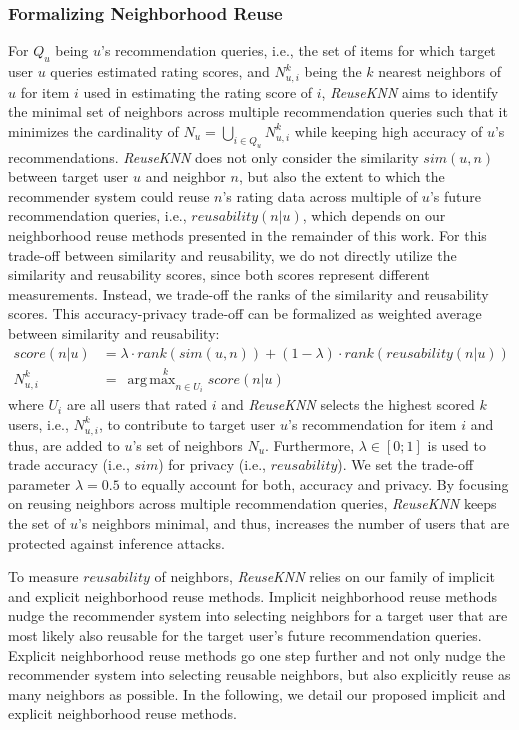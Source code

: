 \documentclass[manuscript,review,anonymous]{acmart}
\DeclareMathOperator*{\argmax}{arg\,max}
\begin{document}
\subsubsection{Formalizing Neighborhood Reuse} 
For $Q_u$ being $u$'s recommendation queries, i.e., the set of items for which target user $u$ queries estimated rating scores, and $N^k_{u, i}$ being the $k$ nearest neighbors of $u$ for item $i$ used in estimating the rating score of $i$, \emph{ReuseKNN} aims to identify the minimal set of neighbors across multiple recommendation queries such that it minimizes the cardinality of $N_u = \bigcup_{i \in Q_u} N^k_{u, i}$
while keeping high accuracy of $u$'s recommendations.
\emph{ReuseKNN} does not only consider the similarity $sim(u, n)$ between target user $u$ and neighbor $n$, but also the extent to which the recommender system could reuse $n$'s rating data across multiple of $u$'s future recommendation queries, i.e., $reusability(n|u)$, which depends on our neighborhood reuse methods presented in the remainder of this work.
For this trade-off between similarity and reusability, we do not directly utilize the similarity and reusability scores, since both scores represent different measurements.
Instead, we trade-off the ranks of the similarity and reusability scores.
This accuracy-privacy trade-off can be formalized as weighted average between similarity and reusability:
\begin{align}
    \label{eq:tradeoff}
    score(n|u) &= \lambda \cdot rank(sim(u, n)) + (1 - \lambda) \cdot rank(reusability(n|u)) \\
    N^k_{u, i} &=\ \stackrel{k}{\argmax_{n \in U_i}} score(n|u)
\end{align}
where $U_i$ are all users that rated $i$ and \emph{ReuseKNN} selects the highest scored $k$ users, i.e., $N^k_{u, i}$, to contribute to target user $u$'s recommendation for item $i$ and thus, are added to $u$'s set of neighbors $N_u$.
Furthermore, $\lambda \in [0; 1]$ is used to trade accuracy (i.e., $sim$) for privacy (i.e., $reusability$).
We set the trade-off parameter $\lambda=0.5$ to equally account for both, accuracy and privacy.
By focusing on reusing neighbors across multiple recommendation queries, \emph{ReuseKNN} keeps the set of $u$'s neighbors minimal, and thus, increases the number of users that are protected against inference attacks.

To measure $reusability$ of neighbors, \emph{ReuseKNN} relies on our family of implicit and explicit neighborhood reuse methods.
Implicit neighborhood reuse methods nudge the recommender system into selecting neighbors for a target user that are most likely also reusable for the target user's future recommendation queries.
Explicit neighborhood reuse methods go one step further and not only nudge the recommender system into selecting reusable neighbors, but also explicitly reuse as many neighbors as possible.
In the following, we detail our proposed implicit and explicit neighborhood reuse methods.
\end{document}
